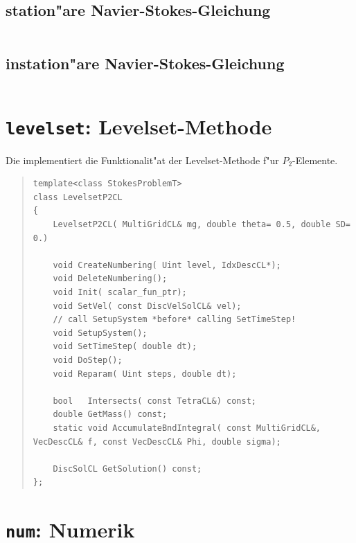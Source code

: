 \documentclass[11pt,a4paper]{article}
\newenvironment{Code}{\begin{quote}\scriptsize}{\end{quote}}
\begin{document}
\subsection{station"are Navier-Stokes-Gleichung}
\begin{Code}
\begin{verbatim}
\end{verbatim}
\end{Code}
\subsection{instation"are Navier-Stokes-Gleichung}
\begin{Code}
\begin{verbatim}
\end{verbatim}
\end{Code}
 
\section{{\tt levelset}: Levelset-Methode}

Die  implementiert die Funktionalit"at der Levelset-Methode
f"ur $P_2$-Elemente. 

\begin{Code}
\begin{verbatim}
template<class StokesProblemT>
class LevelsetP2CL
{
    LevelsetP2CL( MultiGridCL& mg, double theta= 0.5, double SD= 0.)
    
    void CreateNumbering( Uint level, IdxDescCL*);
    void DeleteNumbering();
    void Init( scalar_fun_ptr);
    void SetVel( const DiscVelSolCL& vel);
    // call SetupSystem *before* calling SetTimeStep!
    void SetupSystem();
    void SetTimeStep( double dt);
    void DoStep();
    void Reparam( Uint steps, double dt);
    
    bool   Intersects( const TetraCL&) const;
    double GetMass() const;
    static void AccumulateBndIntegral( const MultiGridCL&, VecDescCL& f, const VecDescCL& Phi, double sigma);
    
    DiscSolCL GetSolution() const;
};
\end{verbatim}
\end{Code}

\section{{\tt num}: Numerik}
\end{document}
